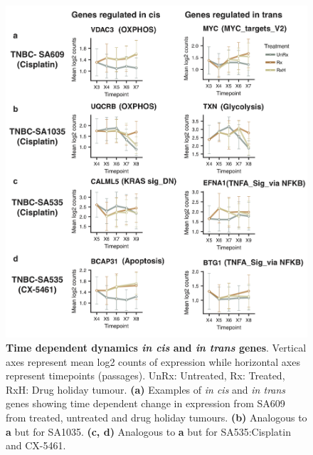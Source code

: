 \begin{figure}
\centering
 \includegraphics{Figures/chap5/fig16_lineplotscistrans.png}
\caption[Examples of \textit{in cis} and \textit{in trans} genes]
	{\small
	 \textbf{Time dependent dynamics \textit{in cis} and \textit{in trans} genes}.
	 Vertical axes represent mean log2 counts of expression while horizontal axes represent timepoints (passages). UnRx: Untreated, Rx: Treated, RxH: Drug holiday tumour. \textbf{(a)} Examples of \textit{in cis} and \textit{in trans} genes showing time dependent change in expression from SA609 from treated, untreated and drug holiday tumours.  \textbf{(b)} Analogous to \textbf{a} but for SA1035. \textbf{(c, d)} Analogous to \textbf{a} but for SA535:Cisplatin and CX-5461.}

	\label{fig:cistrans}
\end{figure}


